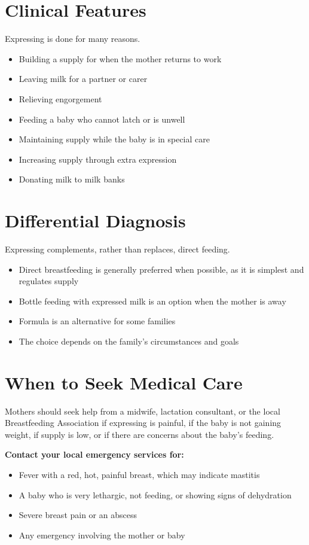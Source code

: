 \section*{Clinical Features}
Expressing is done for many reasons.
\begin{itemize}
    \item Building a supply for when the mother returns to work
    \item Leaving milk for a partner or carer
    \item Relieving engorgement
    \item Feeding a baby who cannot latch or is unwell
    \item Maintaining supply while the baby is in special care
    \item Increasing supply through extra expression
    \item Donating milk to milk banks
\end{itemize}

\section*{Differential Diagnosis}
Expressing complements, rather than replaces, direct feeding.
\begin{itemize}
    \item Direct breastfeeding is generally preferred when possible, as it is simplest and regulates supply
    \item Bottle feeding with expressed milk is an option when the mother is away
    \item Formula is an alternative for some families
    \item The choice depends on the family's circumstances and goals
\end{itemize}

\section*{When to Seek Medical Care}
Mothers should seek help from a midwife, lactation consultant, or the local Breastfeeding Association if expressing is painful, if the baby is not gaining weight, if supply is low, or if there are concerns about the baby's feeding.

\textbf{Contact your local emergency services for:}
\begin{itemize}
    \item Fever with a red, hot, painful breast, which may indicate mastitis
    \item A baby who is very lethargic, not feeding, or showing signs of dehydration
    \item Severe breast pain or an abscess
    \item Any emergency involving the mother or baby
\end{itemize}

